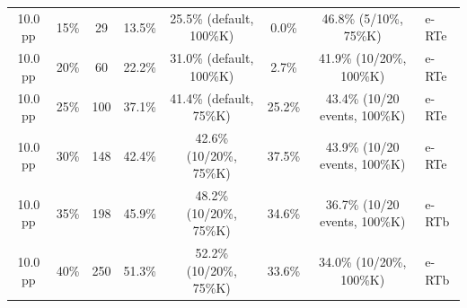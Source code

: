 \begin{table}[htbp]
\begin{tabular}{@{}cccccccl@{}}
10.0 pp & 15\% & 29 & 13.5\% & 25.5\% (default, 100\%K) & 0.0\% & 46.8\% (5/10\%, 75\%K) & e-RTe \\
10.0 pp & 20\% & 60 & 22.2\% & 31.0\% (default, 100\%K) & 2.7\% & 41.9\% (10/20\%, 100\%K) & e-RTe \\
10.0 pp & 25\% & 100 & 37.1\% & 41.4\% (default, 75\%K) & 25.2\% & 43.4\% (10/20 events, 100\%K) & e-RTe \\
10.0 pp & 30\% & 148 & 42.4\% & 42.6\% (10/20\%, 75\%K) & 37.5\% & 43.9\% (10/20 events, 100\%K) & e-RTe \\
10.0 pp & 35\% & 198 & 45.9\% & 48.2\% (10/20\%, 75\%K) & 34.6\% & 36.7\% (10/20 events, 100\%K) & e-RTb \\
10.0 pp & 40\% & 250 & 51.3\% & 52.2\% (10/20\%, 75\%K) & 33.6\% & 34.0\% (10/20\%, 100\%K) & e-RTb \\
\bottomrule
\end{tabular}
\label{tab:erte_tuning_sensitivity}
\end{table}
